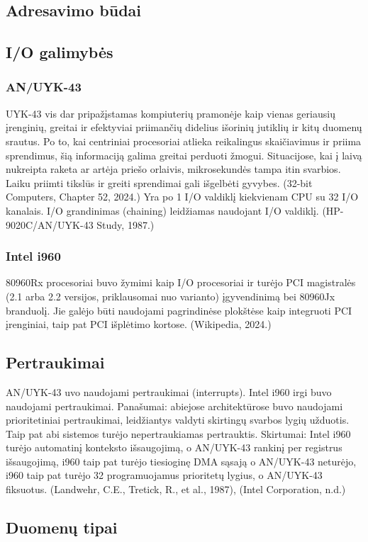 \documentclass{article}
\begin{document}
\subsection{Adresavimo būdai}
\subsection{I/O galimybės}
\subsubsection{AN/UYK-43}
UYK-43 vis dar pripažįstamas kompiuterių pramonėje kaip vienas geriausių įrenginių, greitai ir efektyviai priimančių didelius išorinių jutiklių ir kitų duomenų srautus. Po to, kai centriniai procesoriai atlieka reikalingus skaičiavimus ir priima sprendimus, šią informaciją galima greitai perduoti žmogui. Situacijose, kai į laivą nukreipta raketa ar artėja priešo orlaivis, mikrosekundės tampa itin svarbios. Laiku priimti tikslūs ir greiti sprendimai gali išgelbėti gyvybes. (32-bit Computers, Chapter 52, 2024.) Yra  po 1 I/O valdiklį kiekvienam CPU su 32 I/O kanalais. I/O grandinimas (chaining) leidžiamas naudojant I/O valdiklį. (HP-9020C/AN/UYK-43 Study, 1987.)
\subsubsection{Intel i960}
80960Rx procesoriai buvo žymimi kaip I/O procesoriai ir turėjo PCI magistralės (2.1 arba 2.2 versijos, priklausomai nuo varianto) įgyvendinimą bei 80960Jx branduolį. Jie galėjo būti naudojami pagrindinėse plokštėse kaip integruoti PCI įrenginiai, taip pat PCI išplėtimo kortose. (Wikipedia, 2024.)
\subsection{Pertraukimai}
AN/UYK-43 uvo naudojami pertraukimai (interrupts). Intel i960 irgi buvo naudojami pertraukimai. Panašumai: abiejose architektūrose buvo naudojami prioritetiniai pertraukimai, leidžiantys valdyti skirtingų svarbos lygių užduotis. Taip pat abi sistemos turėjo nepertraukiamas pertrauktis. Skirtumai: Intel i960 turėjo automatinį konteksto išsaugojimą, o AN/UYK-43 rankinį per registrus išsaugojimą, i960 taip pat turėjo tiesioginę DMA sąsają o AN/UYK-43 neturėjo, i960 taip pat turėjo 32 programuojamus prioritetų lygius, o AN/UYK-43 fiksuotus. (Landwehr, C.E., Tretick, R., et al., 1987), (Intel Corporation, n.d.)
\subsection{Duomenų tipai}
\end{document}
